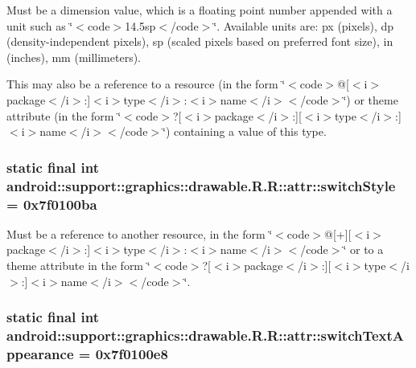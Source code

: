 Must be a dimension value, which is a floating point number appended with a unit such as \char`\"{}$<$code$>$14.5sp$<$/code$>$\char`\"{}. Available units are: px (pixels), dp (density-independent pixels), sp (scaled pixels based on preferred font size), in (inches), mm (millimeters). 

This may also be a reference to a resource (in the form \char`\"{}$<$code$>$@\mbox{[}$<$i$>$package$<$/i$>$:\mbox{]}$<$i$>$type$<$/i$>$:$<$i$>$name$<$/i$>$$<$/code$>$\char`\"{}) or theme attribute (in the form \char`\"{}$<$code$>$?\mbox{[}$<$i$>$package$<$/i$>$:\mbox{]}\mbox{[}$<$i$>$type$<$/i$>$:\mbox{]}$<$i$>$name$<$/i$>$$<$/code$>$\char`\"{}) containing a value of this type. \hypertarget{classandroid_1_1support_1_1graphics_1_1drawable_1_1_r_1_1attr_26427559541fedf28887bd4ad5db9251}{
\subsubsection[{switchStyle}]{\setlength{\rightskip}{0pt plus 5cm}static final int android::support::graphics::drawable.R.R::attr::switchStyle = 0x7f0100ba}}
\label{classandroid_1_1support_1_1graphics_1_1drawable_1_1_r_1_1attr_26427559541fedf28887bd4ad5db9251}


Must be a reference to another resource, in the form \char`\"{}$<$code$>$@\mbox{[}+\mbox{]}\mbox{[}$<$i$>$package$<$/i$>$:\mbox{]}$<$i$>$type$<$/i$>$:$<$i$>$name$<$/i$>$$<$/code$>$\char`\"{} or to a theme attribute in the form \char`\"{}$<$code$>$?\mbox{[}$<$i$>$package$<$/i$>$:\mbox{]}\mbox{[}$<$i$>$type$<$/i$>$:\mbox{]}$<$i$>$name$<$/i$>$$<$/code$>$\char`\"{}. \hypertarget{classandroid_1_1support_1_1graphics_1_1drawable_1_1_r_1_1attr_3e19347e909fce137f90b900a47db270}{
\subsubsection[{switchTextAppearance}]{\setlength{\rightskip}{0pt plus 5cm}static final int android::support::graphics::drawable.R.R::attr::switchTextAppearance = 0x7f0100e8}}
\label{classandroid_1_1support_1_1graphics_1_1drawable_1_1_r_1_1attr_3e19347e909fce137f90b900a47db270}


